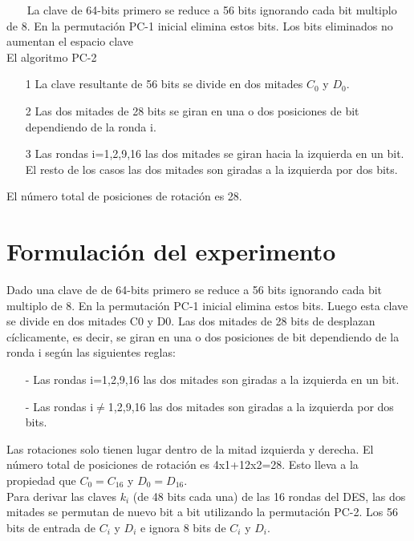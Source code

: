 \documentclass{report}
\begin{document}
~~~
\newline
\newline
\newline
La clave de 64-bits primero se reduce a 56 bits ignorando cada bit multiplo de 8. En la permutaci\'on PC-1 inicial elimina estos bits.
Los bits eliminados no aumentan el espacio clave\\
\newline
\newline
\newline
El algoritmo PC-2\\
\begin{itemize}
\item[1] La clave resultante de 56 bits se divide en dos mitades $C_0$ y $D_0$.\\
\item[2] Las dos mitades de 28 bits se giran en una o dos posiciones de bit dependiendo de la ronda i.\\
\item[3] Las rondas i=1,2,9,16 las dos mitades se giran hacia la izquierda en un bit. El resto de los casos las dos mitades son giradas a la izquierda por dos bits.\\
\end{itemize}
El n\'umero total de posiciones de rotaci\'on es 28.
%
\section{Formulaci\'on del experimento}
Dado una clave de de 64-bits primero se reduce a 56 bits ignorando cada bit multiplo de 8. En la permutaci\'on PC-1 inicial elimina estos bits. Luego esta clave se divide en dos mitades C0 y D0. Las dos mitades de 28 bits de desplazan c\'iclicamente, es decir, se giran en una o dos posiciones de bit dependiendo de la ronda i seg\'un las siguientes reglas:\\
\begin{itemize}
\item[-] Las rondas i=1,2,9,16 las dos mitades son giradas a la izquierda en un bit.
\item[-] Las rondas i$\neq$1,2,9,16 las dos mitades son giradas a la izquierda por dos bits.\\
\end{itemize}
Las rotaciones solo tienen lugar dentro de la mitad izquierda y derecha. El n\'umero total de posiciones de rotaci\'on es 4x1+12x2=28. Esto lleva a la propiedad que $C_0=C_{16}$ y $D_0=D_{16}$.\\
\newline
Para derivar las claves $k_i$ (de 48 bits cada una) de las 16 rondas del DES, las dos mitades se permutan de nuevo bit a bit utilizando la permutaci\'on PC-2. Los 56 bits de entrada de $C_i$ y $D_i$ e ignora 8 bits de $C_i$ y $D_i$.
%
\end{document}

